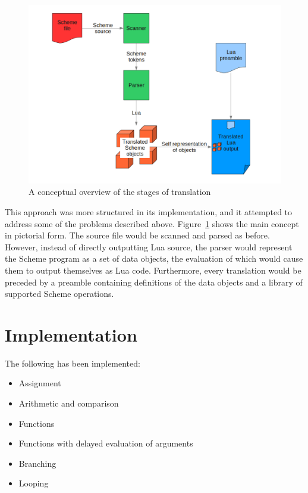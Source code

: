 \begin{figure}
\centering
\includegraphics[width=\textwidth]{overview.png}
\caption{A conceptual overview of the stages of translation}
\label{fig:overview}
\end{figure}

This approach was more structured in its implementation, and it attempted to
address some of the problems described above. Figure~\ref{fig:overview} shows
the main concept in pictorial form. The source file would be scanned and parsed
as before. However, instead of directly outputting Lua source, the parser would
represent the Scheme program as a set of data objects, the evaluation of which
would cause them to output themselves as Lua code. Furthermore, every
translation would be preceded by a preamble containing definitions of the data
objects and a library of supported Scheme operations.


\section{Implementation}

The following has been implemented:
\begin{itemize}
\item Assignment
\item Arithmetic and comparison
\item Functions
\item Functions with delayed evaluation of arguments
\item Branching
\item Looping
\end{itemize}

